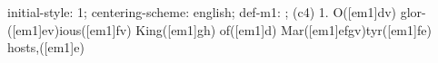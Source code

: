 initial-style: 1;
centering-scheme: english;
def-m1: \grealign;
(c4) 1. O([em1]dv) glor-([em1]ev)ious([em1]fv) King([em1]gh) of([em1]d) Mar([em1]efgv)tyr([em1]fe) hosts,([em1]e)